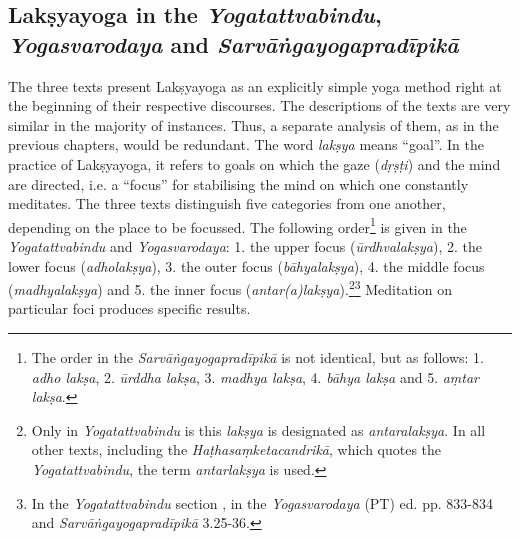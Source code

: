 \subsection{Lakṣyayoga in the \textit{Yogatattvabindu}, \textit{Yogasvarodaya} and \textit{Sarvāṅgayogapradīpikā}}

The three texts present Lakṣyayoga as an explicitly simple yoga method right at the beginning of their respective discourses. The descriptions of the texts are very similar in the majority of instances. Thus, a separate analysis of them, as in the previous chapters, would be redundant. The word \textit{lakṣya} means ``goal''. In the practice of Lakṣyayoga, it refers to goals on which the gaze (\textit{dṛṣṭi}) and the mind are directed, i.e. a ``focus'' for stabilising the mind on which one constantly meditates. The three texts distinguish five categories from one another, depending on the place to be focussed. The following order\footnote{The order in the \textit{Sarvāṅgayogapradīpikā} is not identical, but as follows: 1. \textit{adho lakṣa}, 2. \textit{ūrddha lakṣa}, 3. \textit{madhya lakṣa}, 4. \textit{bāhya lakṣa} and 5. \textit{aṃtar lakṣa}.} is given in the \textit{Yogatattvabindu} and \textit{Yogasvarodaya}: 1. the upper focus (\textit{ūrdhvalakṣya}), 2. the lower focus (\textit{adholakṣya}), 3. the outer focus (\textit{bāhyalakṣya}), 4. the middle focus (\textit{madhyalakṣya}) and 5. the inner focus (\textit{antar(a)lakṣya}).\footnote{Only in \textit{Yogatattvabindu} is this \textit{lakṣya} is designated as \textit{antaralakṣya}. In all other texts, including the \textit{Haṭhasaṃketacandrikā}, which quotes the \textit{Yogatattvabindu}, the term \textit{antarlakṣya} is used.}\footnote{In the \textit{Yogatattvabindu} section , in the \textit{Yogasvarodaya} (PT) ed. pp. 833-834 and \textit{Sarvāṅgayogapradīpikā} 3.25-36.} Meditation on particular foci produces specific results.

